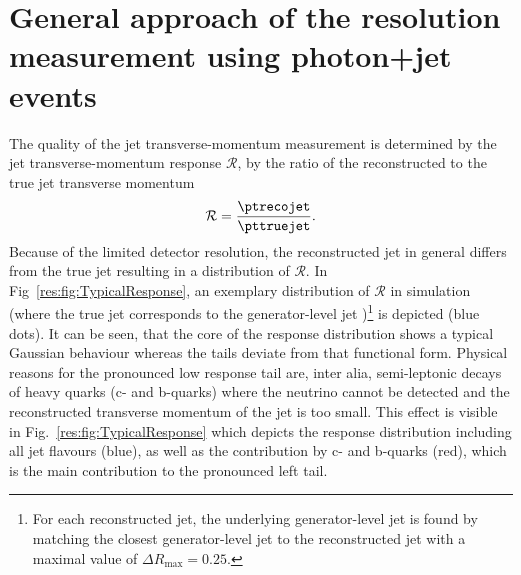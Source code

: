 \FloatBarrier
\chapter{General approach of the resolution measurement using photon+jet events}
\label{res:ch:GeneralApproach}
The quality of the jet transverse-momentum measurement is determined by the jet transverse-momentum response $\mathcal{R}$, \ie by the ratio of the reconstructed to the true jet transverse momentum 
\begin{equation}\label{res:eq:responseFormula}
\mathcal{R} =  \frac{\ptrecojet}{\pttruejet}.
\end{equation}
Because of the limited detector resolution, the reconstructed jet \pt in general differs from the true jet \pt resulting in a distribution of $\mathcal{R}$.
In Fig~\ref{res:fig:TypicalResponse}, an exemplary distribution of $\mathcal{R}$ in simulation (where the true jet \pt corresponds to the generator-level jet \pt)\footnote{For each reconstructed jet, the underlying generator-level jet is found by matching the closest generator-level jet to the reconstructed jet with a maximal value of $\Delta R_{\text{max}}=0.25$.} is depicted (blue dots).
It can be seen, that the core of the response distribution shows a typical Gaussian behaviour whereas the tails deviate from that functional form.
Physical reasons for the pronounced low response tail are, inter alia, semi-leptonic decays of heavy quarks (c- and b-quarks) where the neutrino cannot be detected and the reconstructed transverse momentum of the jet is too small.
This effect is visible in Fig.~\ref{res:fig:TypicalResponse} which depicts the response distribution including all jet flavours (blue), as well as the contribution by c- and b-quarks (red), which is the main contribution to the pronounced left tail.
